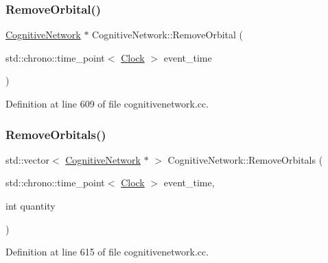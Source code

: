 \mbox{\label{class_cognitive_network_a6ed0e198f6dcfdd45d57df5d3ad5754c}} 
\subsubsection{\texorpdfstring{Remove\+Orbital()}{RemoveOrbital()}}
{\footnotesize\ttfamily \mbox{\hyperlink{class_cognitive_network}{Cognitive\+Network}} $\ast$ Cognitive\+Network\+::\+Remove\+Orbital (\begin{DoxyParamCaption}\item[{std\+::chrono\+::time\+\_\+point$<$ \mbox{\hyperlink{universe_8h_a0ef8d951d1ca5ab3cfaf7ab4c7a6fd80}{Clock}} $>$}]{event\+\_\+time }\end{DoxyParamCaption})}



Definition at line 609 of file cognitivenetwork.\+cc.

\mbox{\label{class_cognitive_network_af7834d400995607c2a5a5eac7b5e006d}} 
\subsubsection{\texorpdfstring{Remove\+Orbitals()}{RemoveOrbitals()}}
{\footnotesize\ttfamily std\+::vector$<$ \mbox{\hyperlink{class_cognitive_network}{Cognitive\+Network}} $\ast$ $>$ Cognitive\+Network\+::\+Remove\+Orbitals (\begin{DoxyParamCaption}\item[{std\+::chrono\+::time\+\_\+point$<$ \mbox{\hyperlink{universe_8h_a0ef8d951d1ca5ab3cfaf7ab4c7a6fd80}{Clock}} $>$}]{event\+\_\+time,  }\item[{int}]{quantity }\end{DoxyParamCaption})}



Definition at line 615 of file cognitivenetwork.\+cc.

\mbox{\label{class_cognitive_network_a0764ede1c23caa7022a01657a0e3726b}} 
